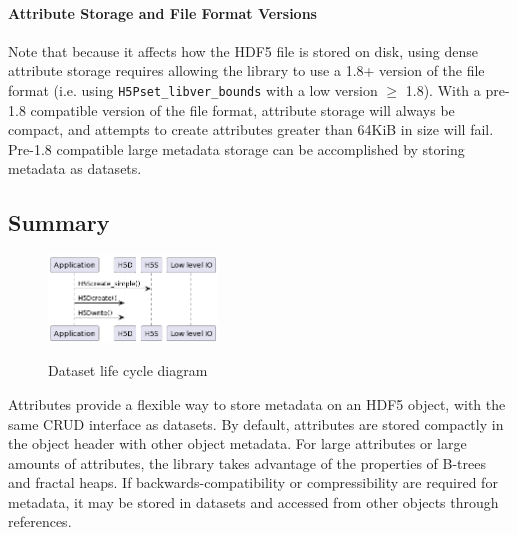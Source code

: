 \paragraph{Attribute Storage and File Format Versions}  Note that because it affects how the HDF5 file is stored on disk, using dense attribute storage requires allowing the library to use a 1.8+ version of the file format (i.e. using \texttt{H5Pset\_libver\_bounds} with a low version $\geq$ 1.8). With a pre-1.8 compatible version of the file format, attribute storage will always be compact, and attempts to create attributes greater than 64KiB in size will fail. Pre-1.8 compatible large metadata storage can be accomplished by storing metadata as datasets.

\subsection{Summary} 

\begin{figure}
\centering
\includegraphics[width=0.4\textwidth]{images/tour_3_uml_temp.png}
\label{fig:tour-3-uml-temp}
\caption{Dataset life cycle diagram}
\end{figure}

Attributes provide a flexible way to store metadata on an HDF5 object, with the same CRUD interface as datasets. By default, attributes are stored compactly in the object header with other object metadata. For large attributes or large amounts of attributes, the library takes advantage of the properties of B-trees and fractal heaps. If backwards-compatibility or compressibility are required for metadata, it may be stored in datasets and accessed from other objects through references.

